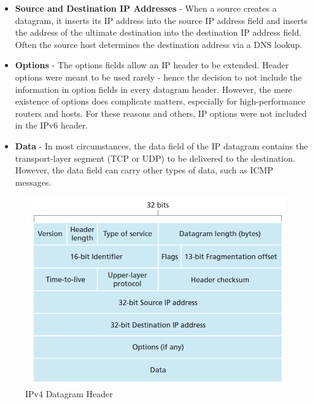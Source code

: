 \begin{itemize}
\item \textbf{Source and Destination IP Addresses} - When a source creates a datagram, it inserts its IP address into the source IP address field and inserts the address of the ultimate destination into the destination IP address field. Often the source host determines the destination address via a DNS lookup.
\item \textbf{Options} -  The options fields allow an IP header to be extended. Header options were meant to be used rarely - hence the decision to not include the information in option fields in every datagram header. However, the mere existence of options does complicate matters, especially for high-performance routers and hosts. For these reasons and others, IP options were not included in the IPv6 header.
\item \textbf{Data} - In most circumstances, the data field of the IP datagram contains the transport-layer segment (TCP or UDP) to be delivered to the destination. However, the data field can carry other types of data, such as ICMP messages.
\end{itemize}
\begin{figure}[H]
\centering
\includegraphics[width=.5\textwidth]{images/IPv4_header.PNG}
\caption{IPv4 Datagram Header}
\label{ipv4_header}
\end{figure}

